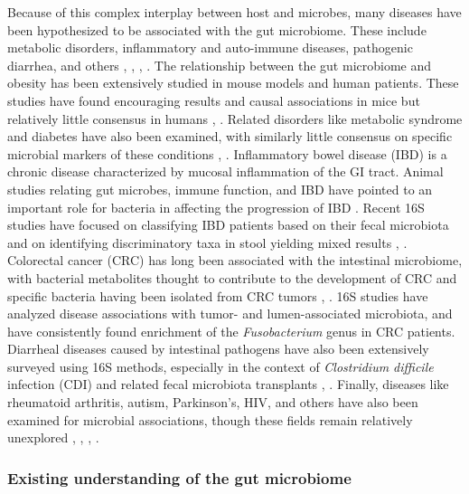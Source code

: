 \documentclass[12pt]{article}
\begin{document}
Because of this complex interplay between host and microbes, many 
diseases have been hypothesized to be associated with the gut 
microbiome. These include metabolic disorders,
inflammatory and auto-immune diseases, pathogenic diarrhea, and others \cite{nash-baker}, \cite{turnbaugh-energy_harvest-2006}, \cite{edd-singh}, \cite{par-schep}.
The relationship between the gut microbiome and obesity has been 
extensively studied in mouse models and human patients. These studies
have found encouraging results and causal associations in mice but 
relatively little consensus in humans \cite{ob-escobar}, \cite{walters-ob_meta-2014}. 
Related disorders like metabolic 
syndrome and diabetes have also been examined, with similarly little consensus on
specific microbial markers of these conditions \cite{mets-stad}, \cite{ob-ross}. 
Inflammatory bowel disease (IBD) is a chronic disease characterized by 
mucosal inflammation of the GI tract. Animal studies relating gut 
microbes, immune function, and IBD have pointed to an important role for 
bacteria in affecting the progression of IBD \cite{tamboli-ibd-2004}. 
Recent 16S studies have focused on classifying IBD patients based on 
their fecal microbiota and on identifying discriminatory taxa in stool yielding mixed results \cite{ibd-papa}, \cite{ibd-gevers}. 
Colorectal cancer (CRC) has long been associated with the intestinal 
microbiome, with bacterial metabolites thought to contribute to the 
development of CRC and specific bacteria having been isolated from CRC 
tumors \cite{crc_zeller}, \cite{crc_xiang}. 16S studies have analyzed disease associations with 
tumor- and lumen-associated microbiota, and have consistently found 
enrichment of the \textit{Fusobacterium} genus in CRC patients. 
Diarrheal diseases caused by intestinal pathogens have also been extensively 
surveyed using 16S methods, especially in the context of 
\textit{Clostridium difficile} infection (CDI) and related fecal 
microbiota transplants \cite{cdi_schubert}, \cite{cdi_vincent}. Finally, diseases like rheumatoid 
arthritis, autism, Parkinson's, HIV, and others have also been 
examined for microbial associations, though these fields remain 
relatively unexplored \cite{ra-littman},  \cite{asd-kb}, \cite{par-schep}, \cite{hiv-dinh}.

\subsubsection{Existing understanding of the gut microbiome}
\end{document}
